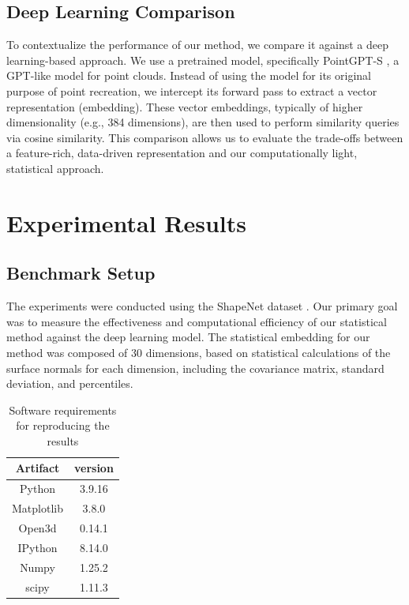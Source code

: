 \documentclass{article}
\begin{document}
\subsection{Deep Learning Comparison}
To contextualize the performance of our method, we compare it against a deep learning-based approach. We use a pretrained model, specifically PointGPT-S \cite{PointGPT}, a GPT-like model for point clouds. Instead of using the model for its original purpose of point recreation, we intercept its forward pass to extract a vector representation (embedding). These vector embeddings, typically of higher dimensionality (e.g., 384 dimensions), are then used to perform similarity queries via cosine similarity. This comparison allows us to evaluate the trade-offs between a feature-rich, data-driven representation and our computationally light, statistical approach.

\section{Experimental Results}

\subsection{Benchmark Setup}
The experiments were conducted using the ShapeNet dataset \cite{ShapeNet}. Our primary goal was to measure the effectiveness and computational efficiency of our statistical method against the deep learning model. The statistical embedding for our method was composed of 30 dimensions, based on statistical calculations of the surface normals for each dimension, including the covariance matrix, standard deviation, and percentiles.

\begin{table}[H]
    \centering
    \begin{tabular}{c|c}
        \toprule
        Artifact & version\\
        \midrule
        Python & 3.9.16\\
        Matplotlib & 3.8.0\\
        Open3d & 0.14.1\\
        IPython & 8.14.0\\
        Numpy & 1.25.2\\
        scipy & 1.11.3\\
        \bottomrule
    \end{tabular}
    \caption{Software requirements for reproducing the results}
    \label{tab:my_label}
\end{table}
\end{document}

